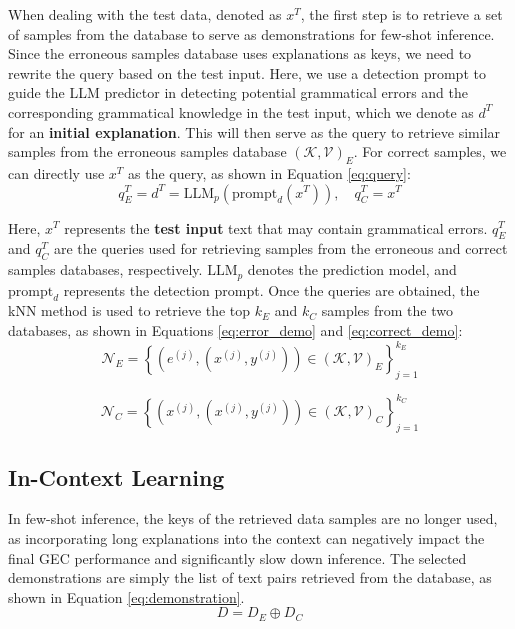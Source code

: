 When dealing with the test data, denoted as $x^T$, the first step is to retrieve a set of samples from the database to serve as demonstrations for few-shot inference. Since the erroneous samples database uses explanations as keys, we need to rewrite the query based on the test input. Here, we use a detection prompt to guide the LLM predictor in detecting potential grammatical errors and the corresponding grammatical knowledge in the test input, which we denote as $d^T$ for an \textbf{initial explanation}. This will then serve as the query to retrieve similar samples from the erroneous samples database $(\mathcal{K}, \mathcal{V})_E$. For correct samples, we can directly use $x^T$ as the query, as shown in Equation \ref{eq:query}:
\begin{equation}
q^T_E=d^T=\mathrm{LLM}_p \left( \mathrm{prompt}_d (x^T) \right), \quad q^T_C=x^T
\label{eq:query}
\end{equation}

Here, $x^T$ represents the \textbf{test input} text that may contain grammatical errors. $q^T_E$ and $q^T_C$ are the queries used for retrieving samples from the erroneous and correct samples databases, respectively. $\mathrm{LLM}_p$ denotes the prediction model, and $\mathrm{prompt}_d$ represents the detection prompt. Once the queries are obtained, the kNN method is used to retrieve the top $k_E$ and $k_C$ samples from the two databases, as shown in Equations \ref{eq:error_demo} and \ref{eq:correct_demo}:
\begin{equation}
\mathcal{N}_E = \left\{ \left( e^{(j)} , ( x^{(j)}, y^{(j)} ) \right) \in (\mathcal{K}, \mathcal{V})_E \right\}_{j=1}^{k_E}
\label{eq:error_demo}
\end{equation}

\begin{equation}
\mathcal{N}_C = \left\{ \left( x^{(j)} , ( x^{(j)}, y^{(j)} ) \right) \in (\mathcal{K}, \mathcal{V})_C \right\}_{j=1}^{k_C}
\label{eq:correct_demo}
\end{equation}

\subsection{In-Context Learning}

In few-shot inference, the keys of the retrieved data samples are no longer used, as incorporating long explanations into the context can negatively impact the final GEC performance and significantly slow down inference. The selected demonstrations are simply the list of text pairs retrieved from the database, as shown in Equation \ref{eq:demonstration}.
\begin{equation}
D = D_E \oplus D_C
\label{eq:demonstration}
\end{equation}

